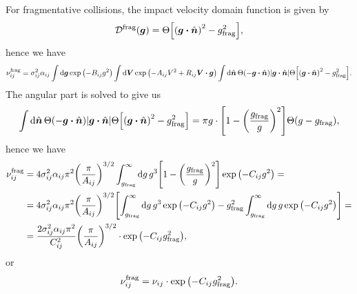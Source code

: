 \documentclass[aps,prl,preprint,groupedaddress,10pt]{revtex4-2}
\begin{document}
For fragmentative collisions, the impact velocity domain function is given by
\begin{equation}
    \utx{\mathcal{D}}{frag}(\bg)=\Theta\bqty{\pqty{\bg\vdot\bn}^2-\ltx{g}{frag}^2},
\end{equation}
hence we have
\begin{equation}
    \utx{\nu_{ij}}{frag}=\sigma_{ij}^2\alpha_{ij}\int\dd{\bg} \exp\pqty{-B_{ij}g^2}
    \int\dd{\bV}\exp\pqty{-A_{ij}V^2+R_{ij}\bV\vdot\bg}
    \int\dd{\bn}\Theta\pqty{-\bg\vdot\bn}\abs{\bg\vdot\bn}
    \Theta\bqty{\pqty{\bg\vdot\bn}^2-\ltx{g}{frag}^2}.
\end{equation}
The angular part is solved to give us
\begin{equation}
    \int\dd{\bn}\Theta\pqty{-\bg\vdot\bn}\abs{\bg\vdot\bn}
    \Theta\bqty{\pqty{\bg\vdot\bn}^2-\ltx{g}{frag}^2}=
    \pi g\cdot\bqty{1-\pqty{\frac{\ltx{g}{frag}}{g}}^2}\Theta\pqty{g-\ltx{g}{frag}},
\end{equation}
hence we have
\begin{equation}
    \begin{split}
        \utx{\nu_{ij}}{frag}&=4\sigma_{ij}^2\alpha_{ij}\pi^2\pqty{\frac{\pi}{A_{ij}}}^{3/2}
        \int_{\ltx{g}{frag}}^{\infty}\dd{g}g^3
        \bqty{1-\pqty{\frac{\ltx{g}{frag}}{g}}^2}\exp\pqty{-C_{ij}g^2}=\\
        &=4\sigma_{ij}^2\alpha_{ij}\pi^2\pqty{\frac{\pi}{A_{ij}}}^{3/2}
        \bqty{\int_{\ltx{g}{frag}}^{\infty}\dd{g}g^3\exp\pqty{-C_{ij}g^2}-
        \ltx{g}{frag}^2\int_{\ltx{g}{frag}}^{\infty}\dd{g}g\exp\pqty{-C_{ij}g^2}}=\\
        &=\frac{2\sigma_{ij}^2\alpha_{ij}\pi^2}{C_{ij}^2}\pqty{\frac{\pi}{A_{ij}}}^{3/2}\cdot
        \exp\pqty{-C_{ij}\ltx{g}{frag}^2},
    \end{split}
\end{equation}
or
\begin{equation}
    \utx{\nu_{ij}}{frag}=\nu_{ij}\cdot\exp\pqty{-C_{ij}\ltx{g}{frag}^2}.
\end{equation}
\end{document}
